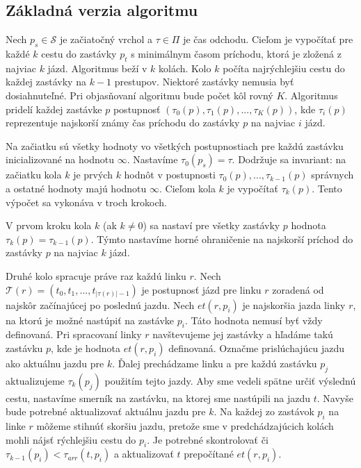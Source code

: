 \subsection{Základná verzia algoritmu}
\label{sub:raptor-basic}

Nech $p_s \in \mathcal{S}$ je začiatočný vrchol a $\tau \in \Pi$ je čas odchodu. Cieľom je vypočítať pre každé $k$ cestu do zastávky $p_t$ s minimálnym časom príchodu, ktorá je zložená z najviac $k$ jázd. Algoritmus beží v $k$ kolách. Kolo $k$ počíta najrýchlejšiu cestu do každej zastávky na $k-1$ prestupov. Niektoré zastávky nemusia byť dosiahnuteľné. Pri objasňovaní algoritmu bude počet kôl rovný $K$. Algoritmus pridelí každej zastávke $p$ postupnosť $(\tau_0(p), \tau_1(p), ..., \tau_K(p))$, kde $\tau_i(p)$ reprezentuje najskorší známy čas príchodu do zastávky $p$ na najviac $i$ jázd. 

Na začiatku sú všetky hodnoty vo všetkých postupnostiach pre každú zastávku inicializované na hodnotu $\infty$. Nastavíme $\tau_0(p_s) = \tau$. Dodržuje sa invariant: na začiatku kola $k$ je prvých $k$ hodnôt v postupnosti $\tau_0(p), ..., \tau_{k-1}(p)$ správnych a ostatné hodnoty majú hodnotu $\infty$. Cieľom kola $k$ je vypočítať $\tau_k(p)$. Tento výpočet sa vykonáva v troch krokoch. 
 
V prvom kroku kola $k$ (ak $k \neq 0$) sa nastaví pre všetky zastávky $p$ hodnota $\tau_k(p) = \tau_{k-1}(p)$. Týmto nastavíme horné ohraničenie na najskorší príchod do zastávky $p$ na najviac $k$ jázd.

Druhé kolo spracuje práve raz každú linku $r$. Nech $\mathcal{T}(r) = (t_0, t_1, ..., t_{|\tau(r)|-1})$ je postupnosť jázd pre linku $r$ zoradená od najskôr začínajúcej po poslednú jazdu. Nech $et(r, p_i)$ je najskoršia jazda linky $r$, na ktorú je možné nastúpiť na zastávke $p_i$. Táto hodnota nemusí byť vždy definovaná. Pri spracovaní linky $r$ navštevujeme jej zastávky a hľadáme takú zastávku $p$, kde je hodnota $et(r, p_i)$ definovaná. Označme prislúchajúcu jazdu ako aktuálnu jazdu pre $k$. Ďalej prechádzame linku a pre každú zastávku $p_j$ aktualizujeme $\tau_k(p_j)$ použitím tejto jazdy. Aby sme vedeli spätne určiť výslednú cestu, nastavíme smerník na zastávku, na ktorej sme nastúpili na jazdu $t$. Navyše bude potrebné aktualizovať aktuálnu jazdu pre $k$. Na každej zo zastávok $p_i$ na linke $r$ môžeme stihnúť skoršiu jazdu, pretože sme v predchádzajúcich kolách mohli nájsť rýchlejšiu cestu do $p_i$. Je potrebné skontrolovať či $\tau_{k-1}(p_i) < \tau_{arr}(t, p_i)$ a aktualizovať $t$ prepočítané $et(r, p_i)$.

